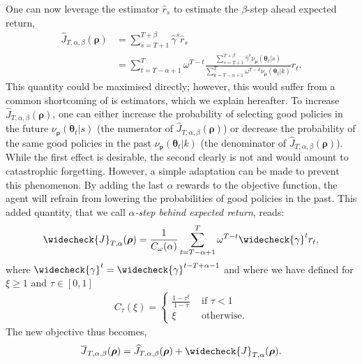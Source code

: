 One can now leverage the estimator $\widehat{r}_{s}$ to estimate the $\beta$-step ahead expected return,
\begin{align*}
    \widehat{J}_{T,\alpha,\beta}({\boldsymbol\rho}) &= \sum_{s=T+1}^{T+\beta} \widehat{\gamma}^{s} \widehat{r}_{s} \\
    & = \sum_{t=T-\alpha+1}^{T} \omega^{T-t} \frac{\sum_{s=T+1}^{T+\beta} \widehat{\gamma}^s \nu_{\boldsymbol\rho}(\boldsymbol\theta_t\vert s)}{\sum_{k=T-\alpha+1}^T \omega^{T-k} \nu_{\boldsymbol\rho}(\boldsymbol\theta_t\vert k)} r_{t}.
\end{align*}
This quantity could be maximised directly; however, this would suffer from a common shortcoming of \gls{is} estimators, which we explain hereafter.
To increase $\widehat{J}_{T,\alpha,\beta}({\boldsymbol\rho})$, one can either increase the probability of selecting good policies in the future $\nu_{\boldsymbol\rho}(\boldsymbol\theta_t\vert s)$ (the numerator of $\widehat{J}_{T,\alpha,\beta}({\boldsymbol\rho})$) or decrease the probability of the same good policies in the past $\nu_{\boldsymbol\rho}(\boldsymbol\theta_t\vert k)$ (the denominator of $\widehat{J}_{T,\alpha,\beta}({\boldsymbol\rho})$). 
While the first effect is desirable, the second clearly is not and would amount to catastrophic forgetting.
However, a simple adaptation can be made to prevent this phenomenon. 
By adding the last $\alpha$ rewards to the objective function, the agent will refrain from lowering the probabilities of good policies in the past. 
This added quantity, that we call \emph{$\alpha$-step behind expected return}, reads:
\begin{align*}
    \widecheck{J}_{T,\alpha}({\boldsymbol\rho}) = \frac{1}{C_\omega(\alpha)} \sum_{t=T-\alpha+1}^{T} \omega^{T-t}  \widecheck{\gamma}^t r_{t},
\end{align*}
where $\widecheck{\gamma}^t = \widecheck{\gamma}^{t-T+\alpha-1}$ and where we have defined for $\xi \ge 1$ and $\tau\in[0,1]$
\begin{align}
\label{eq:def_function_C}
C_\tau(\xi)=\left\{
\begin{array}{cc}
    \frac{1-\tau^\xi}{1-\tau} & \text{ if } \tau<1 \\
    \xi & \text{ otherwise.}
\end{array}\right.
\end{align}
The new objective thus becomes,
\begin{align}
\label{eq:non_yet_objective}
    \overline{J}_{T,\alpha,\beta}(\boldsymbol\rho) = \widehat{J}_{T,\alpha,\beta}({\boldsymbol\rho})  +  \widecheck{J}_{T,\alpha}({\boldsymbol\rho}).
\end{align}


